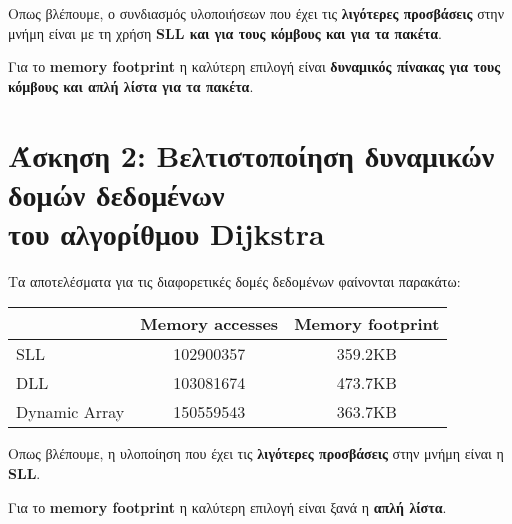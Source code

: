 \documentclass{article}
\newcommand{\english}[1]{\foreignlanguage{english}{{#1}}}
\begin{document}
Οπως βλέπουμε, ο συνδιασμός υλοποιήσεων που έχει τις \textbf{λιγότερες προσβάσεις} στην μνήμη είναι με τη χρήση \textbf{\english{SLL} και για τους κόμβους και για τα πακέτα}.

Για το \english{\textbf{memory footprint}} η καλύτερη επιλογή είναι \textbf{δυναμικός πίνακας για τους κόμβους και απλή λίστα για τα πακέτα}.

\section*{Άσκηση 2: Βελτιστοποίηση δυναμικών δομών δεδομένων \\ του αλγορίθμου \english{Dijkstra}}

Τα αποτελέσματα για τις διαφορετικές δομές δεδομένων φαίνονται παρακάτω:

\begin{otherlanguage}{english}
    \begin{center}
        \begin{tabular}{|p{100pt}|c|c|}\hline
            & Memory accesses & Memory footprint \\ \hline
            SLL & 102900357 & 359.2KB \\ \hline
            DLL & 103081674 & 473.7KB \\ \hline
            Dynamic Array & 150559543 & 363.7KB \\ \hline
       \end{tabular}
    \end{center}
\end{otherlanguage}

Οπως βλέπουμε, η υλοποίηση που έχει τις \textbf{λιγότερες προσβάσεις} στην μνήμη είναι η  \english{\textbf{SLL}}.

Για το \english{\textbf{memory footprint}} η καλύτερη επιλογή είναι ξανά η \textbf{απλή λίστα}.
\end{document}
